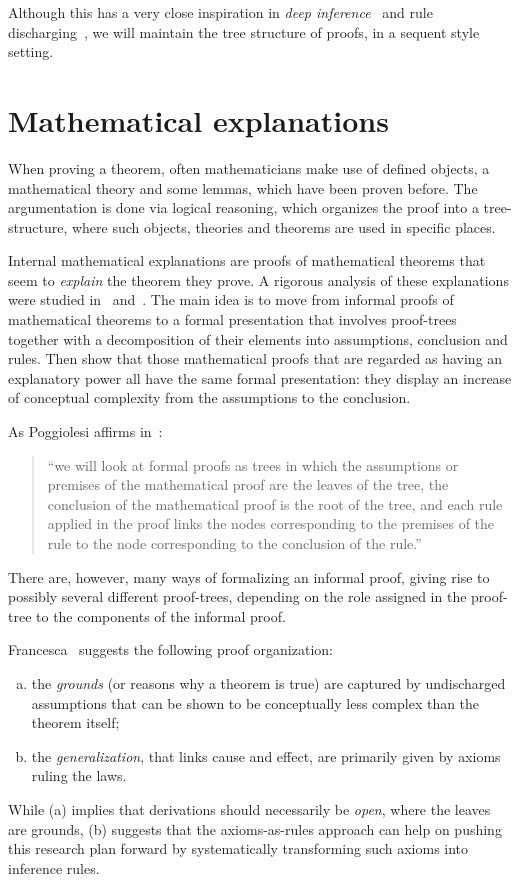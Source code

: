 \documentclass{llncs}
\begin{document}

Although this has a very close inspiration in {\em deep inference}~\cite{guglielmi07tocl} and rule discharging~\cite{DBLP:journals/sLogica/Schroeder-Heister14}, we will maintain the tree structure of proofs, in a sequent style setting.

\section{Mathematical explanations}
When proving a theorem, often mathematicians make use of defined objects, a mathematical theory and some lemmas, which have been proven before. 
The argumentation is done via logical reasoning, which organizes the proof into a tree-structure, where such objects, theories and theorems are used in specific places.  

Internal mathematical explanations are proofs of mathematical theorems that seem to {\em explain} the theorem they prove. A rigorous analysis of these explanations were studied in~\cite{francesca} and~\cite{Poggiolesi2023}. The main idea is  to move from informal proofs of mathematical theorems to a formal presentation that involves proof-trees together with a decomposition of their elements into assumptions, conclusion and rules. Then show that those mathematical proofs that are regarded as having an explanatory power all have the same formal presentation: they display an increase of conceptual complexity from the assumptions to the conclusion.

As Poggiolesi affirms in~\cite{francesca}:
\begin{quote}
``we will look at formal proofs as trees in which the assumptions or premises of the mathematical proof are the leaves of the tree, the conclusion of the mathematical proof is the root of the tree, and each rule applied in the proof links the nodes corresponding to the premises of the rule to the node corresponding to the conclusion of the rule.''
\end{quote}

There are, however, many ways of formalizing an informal proof, giving rise to possibly several different proof-trees, depending on the role assigned in the proof-tree to the components of the informal proof.

Francesca~\cite{francesca} suggests the following proof organization: 
\begin{enumerate}[a.]
\item the {\em grounds} (or reasons why a theorem is true) are captured by undischarged assumptions  that can be shown to be conceptually less complex than the theorem itself;
\item  the {\em generalization}, that links cause and effect, are primarily given by axioms ruling the laws. 
\end{enumerate}
While (a) implies that derivations should necessarily be {\em open}, where the leaves are grounds, (b) suggests that the axioms-as-rules approach can help on pushing this research plan forward by systematically transforming such axioms into inference rules.
\end{document}
